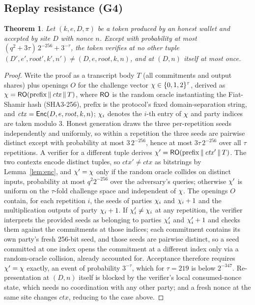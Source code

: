 \documentclass[11pt]{article}
\newtheorem{theorem}{Theorem}
\theoremstyle{definition}
\begin{document}
\subsection{Replay resistance (G4)}

\begin{theorem}
\label{thm:replay}
Let $(k, e, D, \pi)$ be a token produced by an honest wallet and accepted by site $D$ with
nonce $n$. Except with probability at most $(q^2 + 3\tau)\,2^{-256} + 3^{-\tau}$, the
token verifies at no other tuple $(D', e', \mathit{root}', k', n') \ne (D, e,
\mathit{root}, k, n)$, and at $(D, n)$ itself at most once.
\end{theorem}

\begin{proof}
Write the proof as a transcript body $T$ (all commitments and output shares) plus openings
$O$ for the challenge vector $\chi \in \{0,1,2\}^\tau$, derived as $\chi = \mathsf{RO}(\mathrm{prefix}
\,\|\, \mathit{ctx} \,\|\, T)$, where $\mathsf{RO}$ is the random oracle instantiating the
Fiat-Shamir hash (SHA3-256), $\mathrm{prefix}$ is the protocol's fixed domain-separation
string, and $\mathit{ctx} = \mathsf{Enc}(D, e, \mathit{root}, k, n)$; $\chi_i$ denotes the $i$-th
entry of $\chi$ and party indices are taken modulo 3. Honest generation draws the three
per-repetition seeds independently and uniformly, so within a repetition the three seeds
are pairwise distinct except with probability at most $3\,2^{-256}$, hence at most
$3\tau\,2^{-256}$ over all $\tau$ repetitions. A verifier for
a different tuple derives $\chi' = \mathsf{RO}(\mathrm{prefix} \,\|\, \mathit{ctx}' \,\|\, T)$. The two contexts encode
distinct tuples, so $\mathit{ctx}' \ne \mathit{ctx}$ as bitstrings by
Lemma~\ref{lem:enc}, and $\chi' = \chi$ only if the random oracle
collides on distinct inputs, probability at most $q^2 2^{-256}$ over the adversary's
queries; otherwise $\chi'$ is uniform on the $\tau$-fold challenge space and independent of
$\chi$. The openings $O$ contain, for each repetition $i$, the seeds of parties $\chi_i$ and
$\chi_i + 1$ and the multiplication outputs of party $\chi_i + 1$. If $\chi'_i \ne \chi_i$ at any
repetition, the verifier interprets the provided seeds as belonging to parties $\chi'_i$ and
$\chi'_i + 1$ and checks them against the commitments at those indices; each commitment
contains its own party's fresh 256-bit seed, and those seeds are pairwise distinct, so a
seed committed at one index opens the
commitment at a different index only via a random-oracle collision, already accounted for.
Acceptance therefore requires $\chi' = \chi$ exactly, an event of probability $3^{-\tau}$, which
for $\tau = 219$ is below $2^{-347}$. Re-presentation at $(D, n)$ itself is blocked by the
verifier's local consumed-nonce state, which needs no coordination with any other party;
and a fresh nonce at the same site changes $\mathit{ctx}$, reducing to the case above.
\end{proof}
\end{document}
